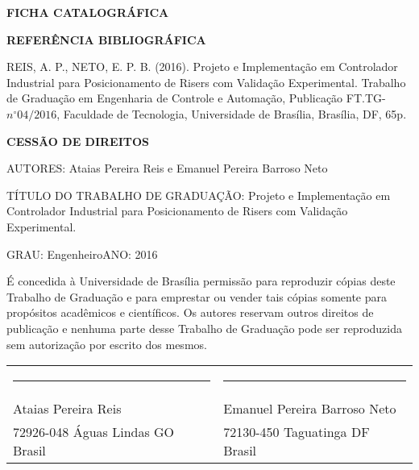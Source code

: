 \noindent \textbf{FICHA CATALOGRÁFICA}

\noindent %

\noindent \medskip{}


\noindent \textbf{REFERÊNCIA BIBLIOGRÁFICA}

REIS, A. P., NETO, E. P. B. (2016). Projeto e Implementação em Controlador Industrial para Posicionamento de Risers com Validação Experimental. Trabalho de Graduação em Engenharia de Controle e Automação, Publicação FT.TG-$n^{\circ}04/2016$, Faculdade de Tecnologia, Universidade
de Brasília, Brasília, DF, 65p.

\noindent \bigskip{}


\noindent \textbf{CESSÃO DE DIREITOS}

\noindent AUTORES: Ataias Pereira Reis e Emanuel Pereira Barroso Neto

TÍTULO DO TRABALHO DE GRADUAÇÃO: Projeto e Implementação em Controlador Industrial para Posicionamento de Risers com Validação Experimental.
\noindent \medskip{}


\noindent GRAU: Engenheiro\hfill{}ANO: 2016\hfill{}

\noindent \medskip{}


É concedida à Universidade de Brasília permissão para reproduzir cópias
deste Trabalho de Graduação e para emprestar ou vender tais cópias
somente para propósitos acadêmicos e científicos. Os autores reservam
outros direitos de publicação e nenhuma parte desse Trabalho de Graduação
pode ser reproduzida sem autorização por escrito dos mesmos.

\noindent \bigskip{}

\noindent \begin{tabular}{ll}
	\rule[0.5ex]{0.5\columnwidth}{1pt} & \rule[0.5ex]{0.5\columnwidth}{1pt}\\
	Ataias Pereira Reis & Emanuel Pereira Barroso Neto\\
	72926-048 Águas Lindas \textendash{} GO \textendash{} Brasil & 72130-450 Taguatinga \textendash{} DF \textendash{} Brasil
\end{tabular}